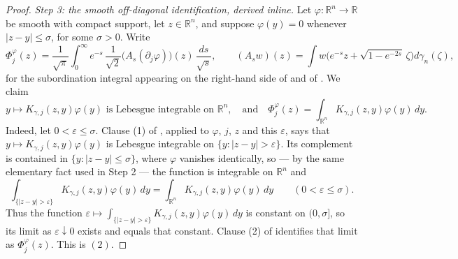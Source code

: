 \begin{proof}
\emph{Step 3: the smooth off-diagonal identification, derived inline.}
Let $\varphi : \mathbb{R}^n \to \mathbb{R}$ be smooth with compact support, let
$z \in \mathbb{R}^n$, and suppose $\varphi(y) = 0$ whenever $|z-y| \leq \sigma$,
for some $\sigma > 0$.  Write
\[
  \Phi_j^\varphi(z) = \frac{1}{\sqrt\pi}\int_0^\infty
      e^{-s}\,\frac{1}{\sqrt2}\bigl(A_s(\partial_j\varphi)\bigr)(z)\,
      \frac{ds}{\sqrt s},
  \qquad
  (A_s w)(z) = \int w\bigl(e^{-s}z + \sqrt{1-e^{-2s}}\,\zeta\bigr)d\gamma_n(\zeta) ,
\]
for the subordination integral appearing on the right-hand side of
 and of .  We claim
\begin{equation*}
  y \mapsto K_{\gamma,j}(z,y)\varphi(y) \text{ is Lebesgue integrable on }
  \mathbb{R}^n, \quad\text{and}\quad
  \Phi_j^\varphi(z) = \int_{\mathbb{R}^n}K_{\gamma,j}(z,y)\varphi(y)\,dy .
  \tag{2}
\end{equation*}
Indeed, let $0 < \varepsilon \leq \sigma$.  Clause (1) of
, applied to $\varphi$, $j$, $z$ and this $\varepsilon$,
says that $y \mapsto K_{\gamma,j}(z,y)\varphi(y)$ is Lebesgue integrable on
$\{y : |z-y| > \varepsilon\}$.  Its complement is contained in
$\{y : |z-y| \leq \sigma\}$, where $\varphi$ vanishes identically, so --- by the
same elementary fact used in Step 2 --- the function is integrable on
$\mathbb{R}^n$ and
\[
  \int_{\{|z-y|>\varepsilon\}}K_{\gamma,j}(z,y)\varphi(y)\,dy
    = \int_{\mathbb{R}^n}K_{\gamma,j}(z,y)\varphi(y)\,dy
  \qquad (0 < \varepsilon \leq \sigma) .
\]
Thus the function $\varepsilon \mapsto
\int_{\{|z-y|>\varepsilon\}}K_{\gamma,j}(z,y)\varphi(y)\,dy$ is constant on
$(0,\sigma]$, so its limit as $\varepsilon \downarrow 0$ exists and equals that
constant.  Clause (2) of  identifies that limit as
$\Phi_j^\varphi(z)$.  This is $(2)$.


\end{proof}
